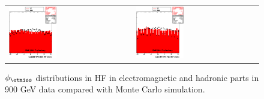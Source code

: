 \begin{figure}[h!]
 \centering
 \begin{tabular}{ll}
  \includegraphics[width=0.40\textwidth]{plots_DataVsMC_MB_900GeV/my_calometEmHFPhi.eps} &
  \includegraphics[width=0.40\textwidth]{plots_DataVsMC_MB_900GeV/my_calometHadHFPhi.eps} \\
 \end{tabular}
 \caption{$\phi_{\etmiss}$ distributions in HF in electromagnetic and hadronic parts in 900 GeV data compared
   with Monte Carlo simulation.
          \label{fig:DataVsMC_MB_900_10}}
\end{figure}


